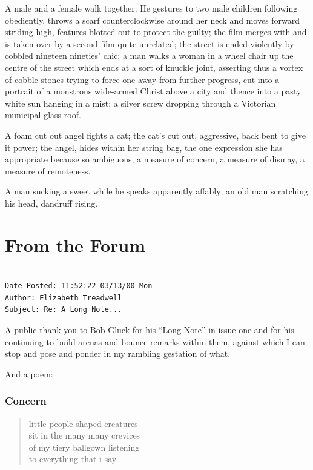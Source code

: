 \documentclass[
]{memoir}
\newlength{\drop}%
\begin{document}
A male and a female walk together. He gestures to two male children
following obediently, throws a scarf counterclockwise around her neck
and moves forward striding high, features blotted out to protect the
guilty; the film merges with and is taken over by a second film quite
unrelated; the street is ended violently by cobbled nineteen nineties'
chic; a man walks a woman in a wheel chair up the centre of the street
which ends at a sort of knuckle joint, asserting thus a vortex of cobble
stones trying to force one away from further progress, cut into a
portrait of a monstrous wide-armed Christ above a city and thence into a
pasty white sun hanging in a mist; a silver screw dropping through a
Victorian municipal glass roof.

A foam cut out angel fights a cat; the cat's cut out, aggressive, back
bent to give it power; the angel, hides within her string bag, the one
expression she has appropriate because so ambiguous, a measure of
concern, a measure of dismay, a measure of remoteness.

A man sucking a sweet while he speaks apparently affably; an old man
scratching his head, dandruff rising.

\backmatter

\hypertarget{from-the-forum}{%
\chapter{From the Forum}\label{from-the-forum}}

\begin{verbatim}

Date Posted: 11:52:22 03/13/00 Mon
Author: Elizabeth Treadwell
Subject: Re: A Long Note...
\end{verbatim}

A public thank you to Bob Gluck for his ``Long Note'' in issue one and
for his continuing to build arenas and bounce remarks within them,
against which I can stop and pose and ponder in my rambling gestation of
what.

And a poem:

\hypertarget{concern}{%
\subsection*{Concern}\label{concern}}

\begin{verse}
little people-shaped creatures\\
sit in the many many crevices\\
of my tiery ballgown listening\\
to everything that i say\\
\end{verse}
\end{document}
